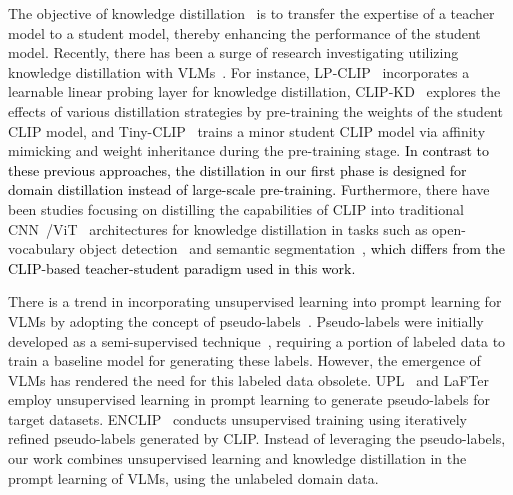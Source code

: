 \documentclass[runningheads]{llncs}
\newcommand{\implus}[1]{\textcolor{black}{#1}}
\begin{document}
{The objective of knowledge distillation~\cite{hinton2015distilling,tian2019contrastive,jiao2019tinybert,li2021online,yang2022mutual,li2023curriculum,WenhuaZhang-MOT1} is to transfer the expertise of a teacher model to a student model, thereby enhancing the performance of the student model. Recently, there has been a surge of research investigating utilizing knowledge distillation with VLMs~\cite{fang2021compressing, wang2022multimodal, yang2023clip, wang2022clip, wu2023tinyclip, li2024promptkd}.
For instance, LP-CLIP~\cite{laroudie2023improving} incorporates a learnable linear probing layer for knowledge distillation, CLIP-KD~\cite{yang2023clip} explores the effects of various distillation strategies by pre-training the weights of the student CLIP model, and Tiny-CLIP~\cite{wu2023tinyclip} trains a minor student CLIP model via affinity mimicking and weight inheritance during the pre-training stage. \implus{In contrast to these previous approaches, the distillation in our first phase is designed for domain distillation instead of large-scale pre-training.} Furthermore, there have been studies focusing on distilling the capabilities of CLIP into traditional CNN~\cite{he2016deep,he2017mask}/ViT~\cite{dosovitskiy2020image} architectures for knowledge distillation in tasks such as open-vocabulary object detection~\cite{gu2021open,liu2023efficient,zhong2022regionclip} and semantic segmentation~\cite{jiao2023learning}, \implus{which differs from the CLIP-based teacher-student paradigm used in this work.}


There is a trend in incorporating unsupervised learning into prompt learning for VLMs by adopting the concept of pseudo-labels~\cite{menghini2023enhancing, huang2022unsupervised, laroudie2023improving, mirza2023lafter, li2024promptkd}. Pseudo-labels were initially developed as a semi-supervised technique~\cite{lee2013pseudo}, requiring a portion of labeled data to train a baseline model for generating these labels. However, the emergence of VLMs has rendered the need for this labeled data obsolete. UPL~\cite{huang2022unsupervised} and LaFTer~\cite{mirza2023lafter} employ unsupervised learning in prompt learning to generate pseudo-labels for target datasets. ENCLIP~\cite{menghini2023enhancing} conducts unsupervised training using iteratively refined pseudo-labels generated by CLIP.
Instead of leveraging the pseudo-labels, our work combines unsupervised learning and knowledge distillation in the prompt learning of VLMs, using the unlabeled domain data.


}
\end{document}
